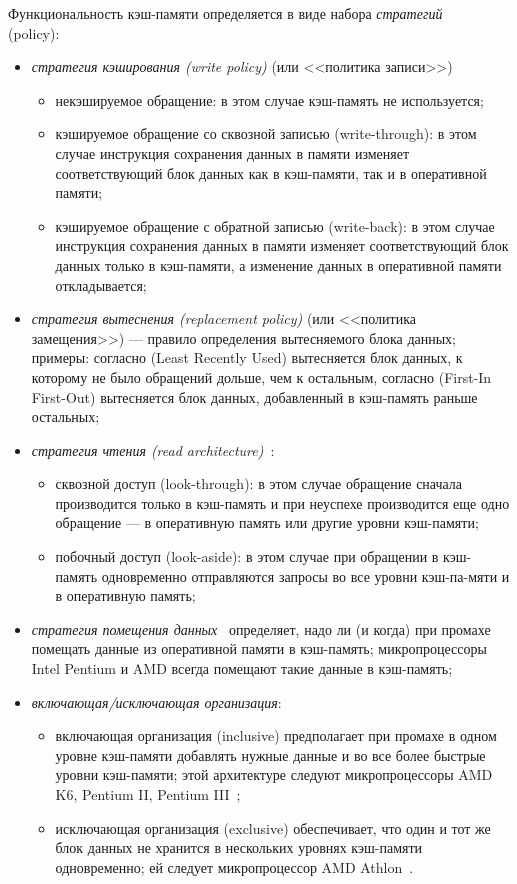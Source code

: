 Функциональность кэш-памяти определяется в виде набора \emph{стратегий}\\ (policy):
\begin{itemize}
	\item \emph{стратегия кэширования (write policy)} (или <<политика записи>>)
		\begin{itemize}
		\item некэшируемое обращение: в этом случае кэш-память не используется;
		\item кэшируемое обращение со сквозной записью (write-through): в этом случае инструкция сохранения данных в памяти изменяет соответствующий блок данных как в кэш-памяти, так и в оперативной памяти;
		\item кэшируемое обращение с обратной записью (write-back): в этом случае инструкция сохранения данных в памяти изменяет соответствующий блок данных только в кэш-памяти, а изменение данных в оперативной памяти откладывается;
		\end{itemize}
	\item \emph{стратегия вытеснения (replacement policy)} (или <<политика замещения>>) --- правило определения вытесняемого блока данных; примеры: согласно \LRU (Least Recently Used) вытесняется блок данных, к которому не было обращений дольше, чем к остальным, согласно \FIFO (First-In First-Out) вытесняется блок данных, добавленный в кэш-память раньше остальных;
	\item \emph{стратегия чтения (read architecture)}~\cite{IntelCache}:
		\begin{itemize}
			\item сквозной доступ (look-through): в этом случае обращение сначала производится только в кэш-память и при неуспехе производится еще одно обращение --- в оперативную память или другие уровни кэш-памяти;
			\item побочный доступ (look-aside): в этом случае при обращении в кэш-память одновременно отправляются запросы во все уровни кэш-па-мяти и в оперативную память;
		\end{itemize}
	\item \emph{стратегия помещения данных}~\cite{Kasperski_EffectiveMemory} определяет, надо ли (и когда) при промахе помещать данные из оперативной памяти в кэш-память; микропроцессоры Intel Pentium и AMD всегда помещают такие данные в кэш-память;
	\item \emph{включающая/исключающая организация}:
		\begin{itemize}
		\item включающая организация (inclusive) предполагает при промахе в одном уровне кэш-памяти добавлять нужные данные и во все более быстрые уровни кэш-памяти; этой архитектуре следуют микропроцессоры AMD K6, Pentium II, Pentium III~\cite{Kasperski_EffectiveMemory};
		\item исключающая организация (exclusive) обеспечивает, что один и тот же блок данных не хранится в нескольких уровнях кэш-памяти одновременно; ей следует микропроцессор AMD Athlon~\cite{Kasperski_EffectiveMemory}.
		\end{itemize}
\end{itemize}

